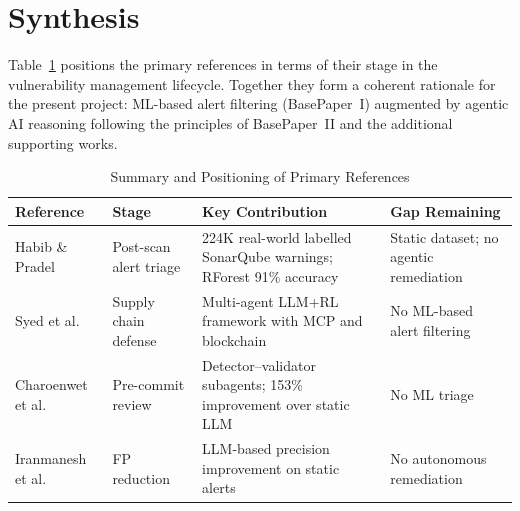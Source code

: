 \section{Synthesis}

Table~\ref{tab:litreview} positions the primary references in terms of their
stage in the vulnerability management lifecycle. Together they form a coherent
rationale for the present project: ML-based alert filtering (BasePaper~I)
augmented by agentic AI reasoning following the principles of BasePaper~II
and the additional supporting works.

\begin{table}[htbp]
  \centering
  \caption{Summary and Positioning of Primary References}
  \label{tab:litreview}
  \renewcommand{\arraystretch}{1.35}
  \begin{tabular}{p{3cm}p{2.5cm}p{4cm}p{2.5cm}}
    \toprule
    \textbf{Reference} & \textbf{Stage} &
    \textbf{Key Contribution} & \textbf{Gap Remaining} \\
    \midrule
    Habib \& Pradel \cite{habib2022sca} &
      Post-scan alert triage &
      224K real-world labelled SonarQube warnings; RForest 91\% accuracy &
      Static dataset; no agentic remediation \\
    Syed et al.\ \cite{syed2025agentic} &
      Supply chain defense &
      Multi-agent LLM+RL framework with MCP and blockchain &
      No ML-based alert filtering \\
    Charoenwet et al.\ \cite{charoenwet2026agenticscr} &
      Pre-commit review &
      Detector--validator subagents; 153\% improvement over static LLM &
      No ML triage \\
    Iranmanesh et al.\ \cite{iranmanesh2025zerofalse} &
      FP reduction &
      LLM-based precision improvement on static alerts &
      No autonomous remediation \\
    \bottomrule
  \end{tabular}
\end{table}
